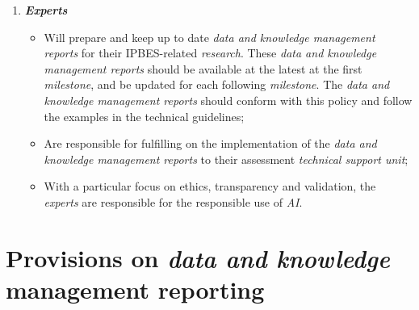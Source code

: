 \documentclass{article}
\begin{document}
\begin{enumerate}[label=(\alph*)]
    \item \textit{\textbf{Experts}}
    \begin{itemize}
        \item Will prepare and keep up to date \textit{data and knowledge management reports} for their IPBES-related \textit{research}. These \textit{data and knowledge management reports} should be available at the latest at the first \textit{milestone}, and be updated for each following \textit{milestone}. The \textit{data and knowledge management reports} should conform with this policy and follow the examples in the technical guidelines;
        \item Are responsible for fulfilling on the implementation of the \textit{data and knowledge management reports} to their assessment \textit{technical support unit};
        \item With a particular focus on ethics, transparency and validation, the \textit{experts} are responsible for the responsible use of \textit{AI}.
    \end{itemize}
\end{enumerate}


\section{Provisions on \textit{data and knowledge} management reporting}
\end{document}
